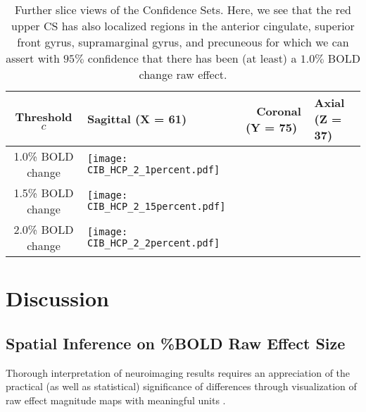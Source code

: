\begin{table}[htbp]
\hspace*{-0.5cm}
\begin{adjustbox}{center}
\centering
    \begin{tabular}{cm{50mm}m{50mm}m{50mm}}
       \toprule
         Threshold $c$ & \hspace{1.4cm} Sagittal (X = 61) & \ \hspace{1.2cm} Coronal (Y = 75) & \hspace{1.0cm} Axial (Z = 37)\\
        \midrule
        1.0\% BOLD change & \texttt{[image: CIB\_HCP\_2\_1percent.pdf]}\\
        1.5\% BOLD change & \texttt{[image: CIB\_HCP\_2\_15percent.pdf]}\\
        2.0\% BOLD change & \texttt{[image: CIB\_HCP\_2\_2percent.pdf]}\\
        \bottomrule
    \end{tabular}
\end{adjustbox}
    \caption{Further slice views of the Confidence Sets. Here, we see that the red upper CS has also localized regions in the anterior cingulate, superior front gyrus, supramarginal gyrus, and precuneous for which we can assert with $95\%$ confidence that there has been (at least) a $1.0\%$ BOLD change raw effect.}
    \label{tbl:HCP_results_two}
\end{table}

\section{Discussion}
\subsection{Spatial Inference on \%BOLD Raw Effect Size}
\label{sec:discussion_inference}
Thorough interpretation of neuroimaging results requires an appreciation of the practical (as well as statistical) significance of differences through visualization of raw effect magnitude maps with meaningful units \citep{Chen2017-sb}.

